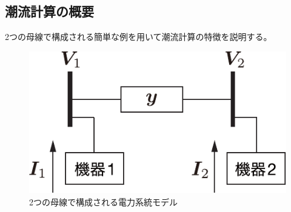 \documentclass[tombow,dvipdfmx]{corona-a5-1.1}
\begin{document}
\subsection{潮流計算の概要}\label{sec:pfcal}

2つの母線で構成される簡単な例を用いて潮流計算の特徴を説明する。

\begin{figure}[t]
\centering
\includegraphics[width = .4\linewidth]{figs/2busex}
\medskip
\caption{2つの母線で構成される電力系統モデル}
\label{fig:2buspf}
\medskip
\end{figure}
\end{document}

